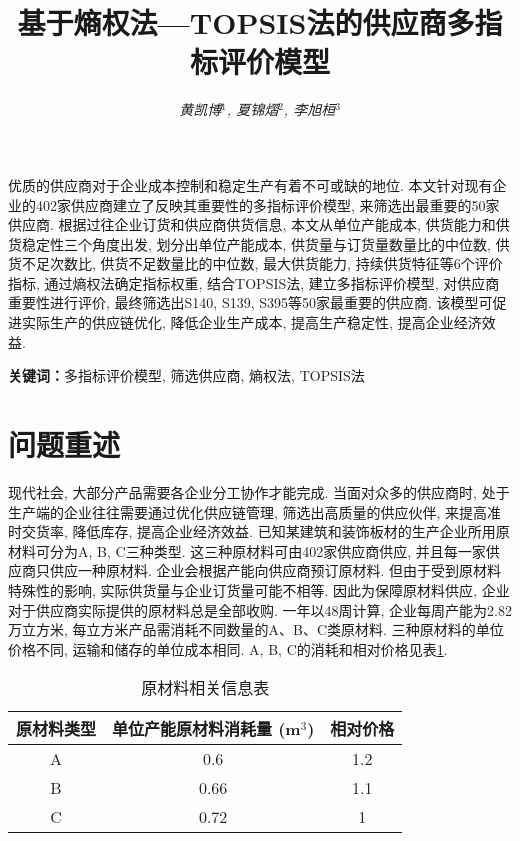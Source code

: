 \documentclass[11pt, fontset = windows]{article}
\title{\textbf{基于熵权法—TOPSIS法的供应商多指标评价模型}}
\author{\textsl{黄凯博$^1$, 夏锦熠$^2$, 李旭桓$^3$}}
\affil{
    \footnotesize{班级：2021211805}\\
    \footnotesize{学号：$^1$2021212532, $^2$2021212057, $^3$2021212066}
}
\date{}
\begin{document}
\maketitle

\begin{cnabstract}

    优质的供应商对于企业成本控制和稳定生产有着不可或缺的地位.
    本文针对现有企业的402家供应商建立了反映其重要性的多指标评价模型, 来筛选出最重要的50家供应商.
    根据过往企业订货和供应商供货信息, 本文从单位产能成本, 供货能力和供货稳定性三个角度出发,
    划分出单位产能成本, 供货量与订货量数量比的中位数, 供货不足次数比, 供货不足数量比的中位数, 最大供货能力, 持续供货特征等6个评价指标,
    通过熵权法确定指标权重, 结合TOPSIS法, 建立多指标评价模型, 对供应商重要性进行评价, 最终筛选出S140, S139, S395等50家最重要的供应商.
    该模型可促进实际生产的供应链优化, 降低企业生产成本, 提高生产稳定性, 提高企业经济效益.

    \textbf{关键词：}多指标评价模型, 筛选供应商, 熵权法, TOPSIS法

\end{cnabstract}

\section[]{问题重述}

现代社会, 大部分产品需要各企业分工协作才能完成. 当面对众多的供应商时, 处于生产端的企业往往需要通过优化供应链管理, 筛选出高质量的供应伙伴, 来提高准时交货率, 降低库存, 提高企业经济效益.
已知某建筑和装饰板材的生产企业所用原材料可分为A, B, C三种类型. 这三种原材料可由402家供应商供应, 并且每一家供应商只供应一种原材料.
企业会根据产能向供应商预订原材料. 但由于受到原材料特殊性的影响, 实际供货量与企业订货量可能不相等. 因此为保障原材料供应, 企业对于供应商实际提供的原材料总是全部收购.
一年以48周计算, 企业每周产能为2.82万立方米, 每立方米产品需消耗不同数量的A、B、C类原材料. 三种原材料的单位价格不同, 运输和储存的单位成本相同. A, B, C的消耗和相对价格见表\ref{原材料相关信息表}.

\begin{table}[h]
    \centering
    \begin{tabular}{ccc}
        \toprule
        原材料类型 & 单位产能原材料消耗量 (m$^3$) & 相对价格 \\ \midrule
        A     & 0.6                & 1.2  \\
        B     & 0.66               & 1.1  \\
        C     & 0.72               & 1    \\ \bottomrule
    \end{tabular}
    \caption{原材料相关信息表}
    \label{原材料相关信息表}
\end{table}
\end{document}
